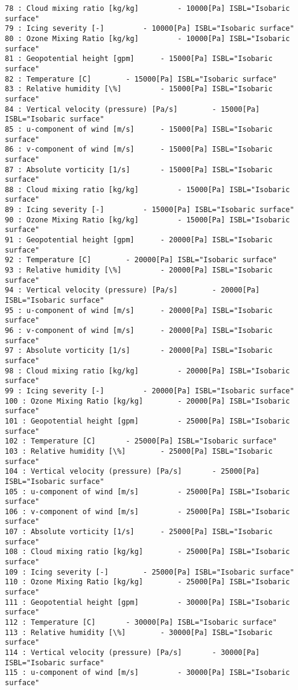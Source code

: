 \documentclass[11pt]{article}
\begin{document}
\begin{Verbatim}[commandchars=\\\{\}]
78 : Cloud mixing ratio [kg/kg] 		- 10000[Pa] ISBL="Isobaric surface"
79 : Icing severity [-] 		- 10000[Pa] ISBL="Isobaric surface"
80 : Ozone Mixing Ratio [kg/kg] 		- 10000[Pa] ISBL="Isobaric surface"
81 : Geopotential height [gpm] 		- 15000[Pa] ISBL="Isobaric surface"
82 : Temperature [C] 		- 15000[Pa] ISBL="Isobaric surface"
83 : Relative humidity [\%] 		- 15000[Pa] ISBL="Isobaric surface"
84 : Vertical velocity (pressure) [Pa/s] 		- 15000[Pa] ISBL="Isobaric surface"
85 : u-component of wind [m/s] 		- 15000[Pa] ISBL="Isobaric surface"
86 : v-component of wind [m/s] 		- 15000[Pa] ISBL="Isobaric surface"
87 : Absolute vorticity [1/s] 		- 15000[Pa] ISBL="Isobaric surface"
88 : Cloud mixing ratio [kg/kg] 		- 15000[Pa] ISBL="Isobaric surface"
89 : Icing severity [-] 		- 15000[Pa] ISBL="Isobaric surface"
90 : Ozone Mixing Ratio [kg/kg] 		- 15000[Pa] ISBL="Isobaric surface"
91 : Geopotential height [gpm] 		- 20000[Pa] ISBL="Isobaric surface"
92 : Temperature [C] 		- 20000[Pa] ISBL="Isobaric surface"
93 : Relative humidity [\%] 		- 20000[Pa] ISBL="Isobaric surface"
94 : Vertical velocity (pressure) [Pa/s] 		- 20000[Pa] ISBL="Isobaric surface"
95 : u-component of wind [m/s] 		- 20000[Pa] ISBL="Isobaric surface"
96 : v-component of wind [m/s] 		- 20000[Pa] ISBL="Isobaric surface"
97 : Absolute vorticity [1/s] 		- 20000[Pa] ISBL="Isobaric surface"
98 : Cloud mixing ratio [kg/kg] 		- 20000[Pa] ISBL="Isobaric surface"
99 : Icing severity [-] 		- 20000[Pa] ISBL="Isobaric surface"
100 : Ozone Mixing Ratio [kg/kg] 		- 20000[Pa] ISBL="Isobaric surface"
101 : Geopotential height [gpm] 		- 25000[Pa] ISBL="Isobaric surface"
102 : Temperature [C] 		- 25000[Pa] ISBL="Isobaric surface"
103 : Relative humidity [\%] 		- 25000[Pa] ISBL="Isobaric surface"
104 : Vertical velocity (pressure) [Pa/s] 		- 25000[Pa] ISBL="Isobaric surface"
105 : u-component of wind [m/s] 		- 25000[Pa] ISBL="Isobaric surface"
106 : v-component of wind [m/s] 		- 25000[Pa] ISBL="Isobaric surface"
107 : Absolute vorticity [1/s] 		- 25000[Pa] ISBL="Isobaric surface"
108 : Cloud mixing ratio [kg/kg] 		- 25000[Pa] ISBL="Isobaric surface"
109 : Icing severity [-] 		- 25000[Pa] ISBL="Isobaric surface"
110 : Ozone Mixing Ratio [kg/kg] 		- 25000[Pa] ISBL="Isobaric surface"
111 : Geopotential height [gpm] 		- 30000[Pa] ISBL="Isobaric surface"
112 : Temperature [C] 		- 30000[Pa] ISBL="Isobaric surface"
113 : Relative humidity [\%] 		- 30000[Pa] ISBL="Isobaric surface"
114 : Vertical velocity (pressure) [Pa/s] 		- 30000[Pa] ISBL="Isobaric surface"
115 : u-component of wind [m/s] 		- 30000[Pa] ISBL="Isobaric surface"

\end{Verbatim}
\end{document}
